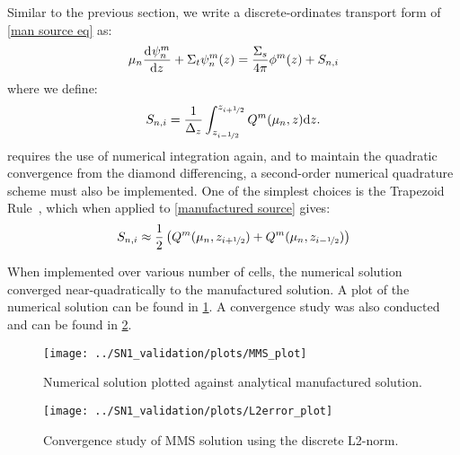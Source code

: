 \documentclass{NE515}
\theoremstyle{definition}
\begin{document}
    Similar to the previous section, we write a discrete-ordinates transport form of \cref{man source eq} as:
    \begin{equation}
        \mu_n \dv[]{\psi_{n}^m}{z}+\Sigma_t \psi_n ^m (z)=\frac{\Sigma_s}{4\pi}\phi^m(z) + S_{n,i}
    \end{equation}
    where we define:
    \begin{equation}
        \label{manufactured source}
        S_{n,i}=\frac{1}{\Delta _z}\int_{z_{i-\nicefrac{1}{2}}}^{z_{i+\nicefrac{1}{2}}}Q^m(\mu_n,z)\dd z.
    \end{equation}
     requires the use of numerical integration again, and to maintain the quadratic convergence from the diamond differencing, a second-order numerical quadrature scheme must also be implemented.
    One of the simplest choices is the Trapezoid Rule~\cite{gezerlisNumericalMethodsPhysicsa}, which when applied to \cref{manufactured source} gives:
    \begin{equation}
        S_{n,i}\approx\frac{1}{2}\left( Q^m(\mu_n,z_{i+\nicefrac{1}{2}})+Q^m(\mu_n,z_{i-\nicefrac{1}{2}})\right)
    \end{equation}

    When implemented over various number of cells, the numerical solution converged near-quadratically to the manufactured solution.
    A plot of the numerical solution can be found in \cref{true-solution-convergence}.
    A convergence study was also conducted and can be found in \cref{convergence-study}.


    \begin{figure}[!htb]
        \centering
        \texttt{[image: ../SN1\_validation/plots/MMS\_plot]}
        \caption{Numerical solution plotted against analytical manufactured solution.}
        \label{true-solution-convergence}
    \end{figure}

    \begin{figure}[!htb]
        \centering
        \texttt{[image: ../SN1\_validation/plots/L2error\_plot]}
        \caption{Convergence study of MMS solution using the discrete L2-norm.}
        \label{convergence-study}
    \end{figure}

    \clearpage
\end{document}
